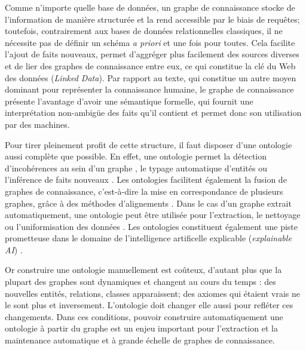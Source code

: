 Comme n'importe quelle base de données, un graphe de connaissance stocke de l'information de manière structurée et la rend accessible par le biais de requêtes; toutefois, contrairement aux bases de données relationnelles classiques, il ne nécessite pas de définir un schéma \textit{a priori} et une fois pour toutes. Cela facilite l'ajout de faits nouveaux, permet d'aggréger plus facilement des sources diverses et de lier des graphes de connaissance entre eux, ce qui constitue la clé du Web des données (\textit{Linked Data}).
Par rapport au texte, qui constitue un autre moyen dominant pour représenter la connaissance humaine, le graphe de connaissance présente l'avantage d'avoir une sémantique formelle, qui fournit une interprétation non-ambigüe des faits qu'il contient et permet donc son utilisation par des machines.

Pour tirer pleinement profit de cette structure, il faut disposer d'une ontologie aussi complète que possible. %
%
En effet, une ontologie permet la détection d'incohérences au sein d'un graphe \cite{inconsistencies2012dbpedia}, le typage automatique d'entités \cite{typing2017kejriwal} ou l'inférence de faits nouveaux \cite{inference2015dinto}. Les ontologies facilitent également la fusion de graphes de connaissance, c'est-à-dire la mise en correspondance de plusieurs graphes, grâce à des méthodes d'alignements \cite{otero2015ontology}. Dans le cas d'un graphe extrait automatiquement, une ontologie peut être utilisée pour l'extraction, le nettoyage ou l'uniformisation des données \cite{webmining2011bhatia, webmining2014li}. Les ontologies constituent également une piste prometteuse dans le domaine de l'intelligence artificelle explicable (\textit{explainable AI}) \cite{explainable2018holzinger, explainable2019cardillo, explainable2019semantic}.

Or construire une ontologie manuellement est coûteux, d'autant plus que la plupart des graphes sont dynamiques et changent au cours du temps : des nouvelles entités, relations, classes apparaissent; des axiomes qui étaient vrais ne le sont plus et inversement. L'ontologie doit changer elle aussi pour refléter ces changements. Dans ces conditions, pouvoir construire automatiquement une ontologie à partir du graphe est un enjeu important pour l'extraction et la maintenance automatique et à grande échelle de graphes de connaissance.

